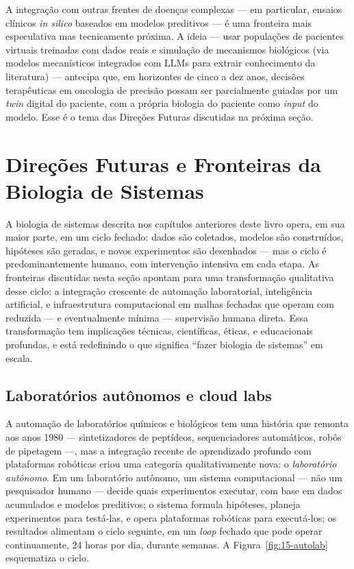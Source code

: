 A integração com outras frentes de doenças complexas --- em particular, ensaios clínicos \emph{in silico} baseados em modelos preditivos --- é uma fronteira mais especulativa mas tecnicamente próxima. A ideia --- usar populações de pacientes virtuais treinadas com dados reais e simulação de mecanismos biológicos (via modelos mecanísticos integrados com LLMs para extrair conhecimento da literatura) --- antecipa que, em horizontes de cinco a dez anos, decisões terapêuticas em oncologia de precisão possam ser parcialmente guiadas por um \emph{twin} digital do paciente, com a própria biologia do paciente como \emph{input} do modelo. Esse é o tema das Direções Futuras discutidas na próxima seção.



\section{Direções Futuras e Fronteiras da Biologia de Sistemas}
\label{sec:15-futuras}

A biologia de sistemas descrita nos capítulos anteriores deste livro opera, em sua maior parte, em um ciclo fechado: dados são coletados, modelos são construídos, hipóteses são geradas, e novos experimentos são desenhados --- mas o ciclo é predominantemente humano, com intervenção intensiva em cada etapa. As fronteiras discutidas nesta seção apontam para uma transformação qualitativa desse ciclo: a integração crescente de automação laboratorial, inteligência artificial, e infraestrutura computacional em malhas fechadas que operam com reduzida --- e eventualmente mínima --- supervisão humana direta. Essa transformação tem implicações técnicas, científicas, éticas, e educacionais profundas, e está redefinindo o que significa ``fazer biologia de sistemas'' em escala.

\subsection{Laboratórios autônomos e cloud labs}
\label{sec:15-autolabs}

A automação de laboratórios químicos e biológicos tem uma história que remonta aos anos 1980 --- sintetizadores de peptídeos, sequenciadores automáticos, robôs de pipetagem ---, mas a integração recente de aprendizado profundo com plataformas robóticas criou uma categoria qualitativamente nova: o \emph{laboratório autônomo}. Em um laboratório autônomo, um sistema computacional --- não um pesquisador humano --- decide quais experimentos executar, com base em dados acumulados e modelos preditivos; o sistema formula hipóteses, planeja experimentos para testá-las, e opera plataformas robóticas para executá-los; os resultados alimentam o ciclo seguinte, em um \emph{loop} fechado que pode operar continuamente, 24 horas por dia, durante semanas. A Figura~\ref{fig:15-autolab} esquematiza o ciclo.

